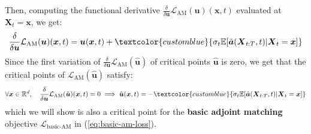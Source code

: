 \documentclass{article}
\newcommand{\bluetext}[1]{\textcolor{customblue}{#1}}
\begin{document}
Then, computing the functional derivative $\frac{\delta}{\delta\boldsymbol{u}}\mathcal{L}_{\text{AM}}(\boldsymbol{u})(\boldsymbol{x},t)$ evaluated at $\boldsymbol{X}_t=\boldsymbol{x}$, we get: 
\begin{align}
    \frac{\delta}{\delta \boldsymbol{u}}\mathcal{L}_{\text{AM}}(\boldsymbol{u})(\boldsymbol{x},t)=\boldsymbol{u}(\boldsymbol{x},t)+\bluetext{\sigma_t\mathbb{E}[\tilde{\boldsymbol{a}}(\boldsymbol{X}_{t:T},t)|\boldsymbol{X}_t=\boldsymbol{x}]}\label{eq:lean-am-functional-derivative}
\end{align}
Since the first variation of $\frac{\delta}{\delta \boldsymbol{u}}\mathcal{L}_{\text{AM}}(\hat{\boldsymbol{u}})$ of critical points $\hat{\boldsymbol{u}}$ is zero, we get that the critical points of $\mathcal{L}_{\text{AM}}(\hat{\boldsymbol{u}})$ satisfy:
\begin{align}
    \forall \boldsymbol{x}\in \mathbb{R}^d, \quad \frac{\delta}{\delta \boldsymbol{u}}\mathcal{L}_{\text{AM}}(\hat{\boldsymbol{u}})(\boldsymbol{x},t)=0\implies \hat{\boldsymbol{u}}(\boldsymbol{x},t)=-\bluetext{\sigma_t\mathbb{E}[\tilde{\boldsymbol{a}}(\boldsymbol{X}_{t:T},t)|\boldsymbol{X}_t=\boldsymbol{x}]}\label{eq:lean-adjoint-proof1}
\end{align}
which we will show is also a critical point for the \textbf{basic adjoint matching} objective $\mathcal{L}_{\text{basic-AM}}$ in (\ref{eq:basic-am-loss}).
\end{document}
